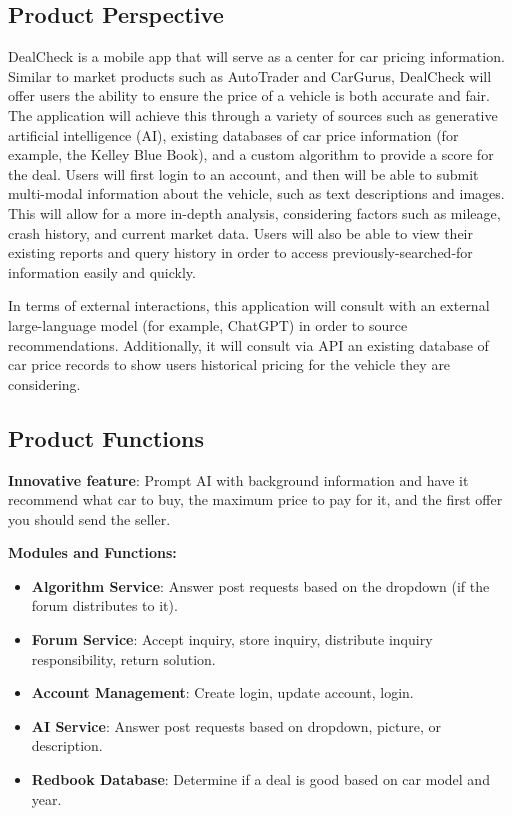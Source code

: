 \documentclass[]{article}
\begin{document}
\subsection{Product Perspective}
\label{sub:product_perspective}
DealCheck is a mobile app that will serve as a center for car pricing information. Similar to market products such as AutoTrader and CarGurus, DealCheck will offer users the ability to ensure the price of a vehicle is both accurate and fair. The application will achieve this through a variety of sources such as generative artificial intelligence (AI), existing databases of car price information (for example, the Kelley Blue Book), and a custom algorithm to provide a score for the deal. Users will first login to an account, and then will be able to submit multi-modal information about the vehicle, such as text descriptions and images. This will allow for a more in-depth analysis, considering factors such as mileage, crash history, and current market data. Users will also be able to view their existing reports and query history in order to access previously-searched-for information easily and quickly.

In terms of external interactions, this application will consult with an external large-language model (for example, ChatGPT) in order to source recommendations. Additionally, it will consult via API an existing database of car price records to show users historical pricing for the vehicle they are considering.

\subsection{Product Functions}
\label{sub:product_functions}
\textbf{Innovative feature}: Prompt AI with background information and have it recommend what car to buy, the maximum price to pay for it, and the first offer you should send the seller.

\textbf{Modules and Functions:}
\begin{itemize}
    \item \textbf{Algorithm Service}: Answer post requests based on the dropdown (if the forum distributes to it).
    \item \textbf{Forum Service}: Accept inquiry, store inquiry, distribute inquiry responsibility, return solution.
    \item \textbf{Account Management}: Create login, update account, login.
    \item \textbf{AI Service}: Answer post requests based on dropdown, picture, or description.
    \item \textbf{Redbook Database}: Determine if a deal is good based on car model and year.
\end{itemize}
\end{document}
